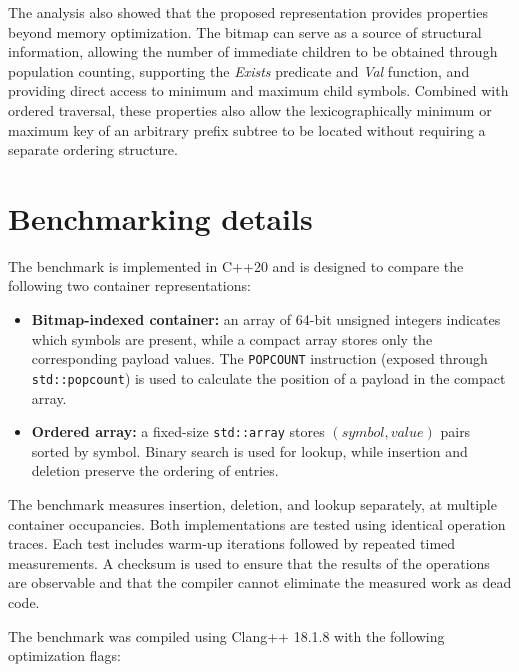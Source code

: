 \documentclass[11pt,twoside]{article}
\begin{document}
    The analysis also showed that the proposed representation provides properties beyond memory optimization.
    The bitmap can serve as a source of structural information, allowing the number of immediate children to be
    obtained through population counting, supporting the \textit{Exists} predicate and \textit{Val} function, and providing
    direct access to minimum and maximum child symbols. Combined with ordered traversal, these properties also allow the
    lexicographically minimum or maximum key of an arbitrary prefix subtree to be located without requiring
    a separate ordering structure.

    \appendix
    \section{Benchmarking details}\label{sec:benchmarking-details}
    The benchmark is implemented in C++20 and is designed to compare
    the following two container representations:

    \begin{itemize}
        \item \textbf{Bitmap-indexed container:} an array of 64-bit
        unsigned integers indicates which symbols are present, while
        a compact array stores only the corresponding payload values.
        The \texttt{POPCOUNT} instruction (exposed through
        \texttt{std::popcount}) is used to calculate the position
        of a payload in the compact array.

        \item \textbf{Ordered array:} a fixed-size \texttt{std::array}
        stores $(symbol, value)$ pairs sorted by symbol. Binary search
        is used for lookup, while insertion and deletion preserve
        the ordering of entries.
    \end{itemize}

    The benchmark measures insertion, deletion, and lookup separately,
    at multiple container occupancies. Both implementations are tested
    using identical operation traces. Each test includes warm-up
    iterations followed by repeated timed measurements. A checksum
    is used to ensure that the results of the operations are observable
    and that the compiler cannot eliminate the measured work
    as dead code.


    The benchmark was compiled using Clang++ 18.1.8 with the following
    optimization flags:
\end{document}
